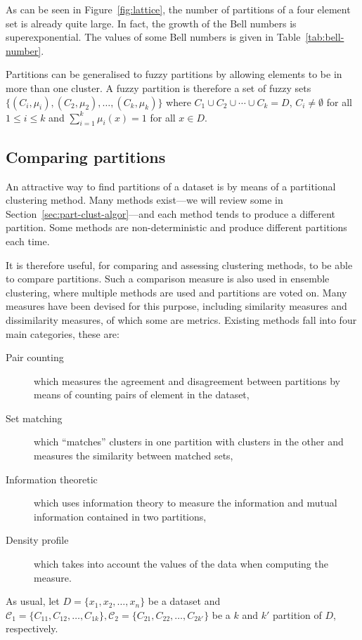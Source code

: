 \documentclass[a4paper]{report}
\newcommand{\dset}{D}
\newcommand{\clus}{\mathcal{C}}
\begin{document}
As can be seen in Figure~\ref{fig:lattice}, the number of partitions of a four
element set is already quite large.  In fact, the growth of the Bell numbers
is superexponential.  The values of some Bell numbers is given in
Table~\ref{tab:bell-number}.

Partitions can be generalised to fuzzy partitions by allowing elements to be
in more than one cluster.  A fuzzy partition is therefore a set of fuzzy sets
$\{(C_i,\mu_i),(C_2,\mu_2),\dotsc,(C_k,\mu_k)\}$ where $C_1 \cup C_2 \cup
\dotsb \cup C_k = \dset$, $C_i \neq \emptyset$ for all $1 \leq i \leq k$ and
$\sum_{i=1}^{k} \mu_i(x) = 1$ for all $x \in \dset$.

\subsection{Comparing partitions}
\label{sec:comparing-partitions}

An attractive way to find partitions of a dataset is by means of a partitional
clustering method.  Many methods exist---we will review some in
Section~\ref{sec:part-clust-algor}---and each method tends to produce
a different partition.  Some methods are non-deterministic and produce
different partitions each time.

It is therefore useful, for comparing and assessing clustering methods, to be
able to compare partitions.  Such a comparison measure is also used in
ensemble clustering, where multiple methods are used and partitions are voted
on.  Many measures have been devised for this purpose, including similarity
measures and dissimilarity measures, of which some are metrics.  Existing
methods fall into four main categories, these are:
\begin{description}
\item[Pair counting] which measures the agreement and disagreement between
  partitions by means of counting pairs of element in the dataset,
\item[Set matching] which ``matches'' clusters in one partition with clusters
  in the other and measures the similarity between matched sets,
\item[Information theoretic] which uses information theory to measure the
  information and mutual information contained in two partitions,
\item[Density profile] which takes into account the values of the data when
  computing the measure.
\end{description}

As usual, let $\dset = \{x_1,x_2,\dotsc,x_n\}$ be a dataset and $\clus_1 =
\{C_{11},C_{12},\dotsc,C_{1k}\},\clus_2 = \{C_{21},C_{22},\dotsc,C_{2k'}\}$ be
a $k$ and $k'$ partition of $\dset$, respectively.
\end{document}

